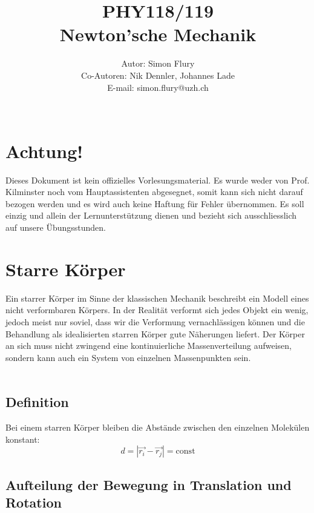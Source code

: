 \documentclass[12pt]{article}
\begin{document}
\title{PHY118/119 \\ {\bf Newton'sche Mechanik}}
\author{Autor: Simon Flury \\ Co-Autoren: Nik Dennler, Johannes Lade \\ E-mail: simon.flury@uzh.ch \\\\ }
\maketitle

\section{Achtung!}
Dieses Dokument ist kein offizielles Vorlesungsmaterial. Es wurde weder von Prof. Kilminster noch vom Hauptassistenten abgesegnet, somit kann sich nicht darauf bezogen werden und es wird auch keine Haftung für Fehler übernommen. Es soll einzig und allein der Lernunterstützung dienen und bezieht sich ausschliesslich auf unsere Übungsstunden.

\section{Starre Körper}
Ein starrer Körper im Sinne der klassischen Mechanik beschreibt ein Modell eines nicht verformbaren Körpers. In der Realität verformt sich jedes Objekt ein wenig, jedoch meist nur soviel, dass wir die Verformung vernachlässigen können und die Behandlung als idealisierten starren Körper gute Näherungen liefert. Der Körper an sich muss nicht zwingend eine kontinuierliche Massenverteilung aufweisen, sondern kann auch ein System von einzelnen Massenpunkten sein.\\
\\
\subsection{Definition}
Bei einem starren Körper bleiben die Abstände zwischen den einzelnen Molekülen konstant:
\begin{equation}
d = |\vec{r_i} - \vec{r_j}| = \mathrm{const}
\end{equation}

\newpage
\subsection{Aufteilung der Bewegung in Translation und Rotation}
\end{document}
